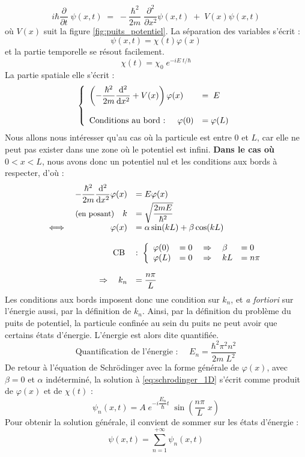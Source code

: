 \documentclass[12pt, a4paper]{book}
\begin{document}
\begin{equation}\label{eq:schrodinger_1D}
i \hbar \dfrac{\partial }{\partial t} \; \psi(x, t) \; = \; -\dfrac{\hbar ^2}{2m} \; \dfrac{ \partial ^2}{\partial x^2} \psi(x, t) \; + \; V(x) \psi(x,t)
\end{equation}
où $V(x)$ suit la figure \ref{fig:puits_potentiel}.
La séparation des variables s'écrit :
$$\psi(x,t) = \chi(t) \varphi(x)$$ et la partie temporelle se résout facilement.
$$\chi(t) = \chi_0 \; e^{-iE\; t/\hbar}$$
La partie spatiale elle s'écrit :
$$\left \{ \begin{array}{ll}
\left(-\dfrac{\hbar ^2}{2m} \dfrac{ \mathrm{d} ^2}{\mathrm{d} x^2 }  + V(x)\right) \varphi(x) \; &= \; E \\ \strut \\
\text{Conditions au bord : } \quad \varphi(0) &= \varphi(L)
\end{array} \right. $$
Nous allons nous intéresser qu'au cas où la particule est entre $0$ et $L$, car elle ne peut pas exister dans une zone où le potentiel est infini. \textbf{Dans le cas où} $0<x<L$, nous avons donc un potentiel nul et les conditions aux bords à respecter, d'où :
\begin{equation}
\begin{array}{lrl}
& -\dfrac{\hbar ^2}{2m} \dfrac{ \mathrm{d} ^2}{\mathrm{d} x^2 } \varphi(x) &= E \varphi (x) \\
&\text{\small (en posant)} \quad k &= \sqrt{\dfrac{2mE}{\hbar ^2}} \\
\iff & \varphi(x) &= \alpha \sin(kL) + \beta\cos(kL) \\ \strut \\
&\text{CB} \;  &:  \; \left\{ \begin{array}{lll}
\varphi(0) &= 0 \quad \Rightarrow \quad \beta &= 0 \\
\varphi(L) &= 0 \quad \Rightarrow \quad kL &= n\pi \\
\end{array}\right. \\ \strut \\
&\Rightarrow \quad k_n &= \dfrac{n\pi}{L}
\end{array}
\end{equation}
Les conditions aux bords imposent donc une condition sur $k_n$, et \textit{a fortiori} sur l'énergie aussi, par la définition de $k_n$. Ainsi, par la définition du problème du puits de potentiel, la particule confinée au sein du puits ne peut avoir que certains états d'énergie. L'énergie est alors dite quantifiée.
\begin{equation}\label{eq:quantification_energie}
\boxed{\text{Quantification de l'énergie : } \quad E_n = \dfrac{\hbar ^2 \pi ^2 n ^2}{2m \; L^2}}
\end{equation}
De retour à l'équation de Schrödinger avec la forme générale de $\varphi(x)$, avec $\beta = 0$ et $\alpha$ indéterminé, la solution à \eqref{eq:schrodinger_1D} s'écrit comme produit de $\varphi(x)$ et de $\chi(t)$ :
$$\psi_n(x,t) = A \; e^{-i \dfrac{E_n}{\hbar}t} \; \sin(\dfrac{n\pi}{L} \; x) $$
Pour obtenir la solution générale, il convient de sommer sur les états d'énergie :
$$\psi(x,t) = \sum_{n=1} ^{+\infty} \psi_n(x,t) $$
\end{document}
